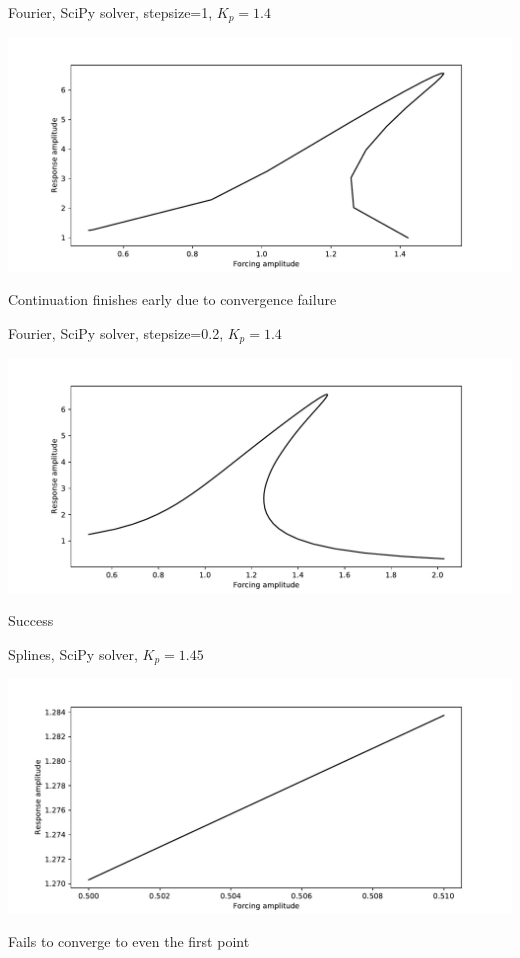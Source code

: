 \documentclass[presentation]{beamer}
\begin{document}
\begin{frame}[label={sec:org4d6362d}]{Fourier, SciPy solver, stepsize=1, \(K_p=1.4\)}
\begin{center}
\includegraphics[width=.9\linewidth]{./kp1d4_transtime100_scipy_fourier.pdf}
\end{center}

Continuation finishes early due to convergence failure
\end{frame}

\begin{frame}[label={sec:org28c3247}]{Fourier, SciPy solver, stepsize=0.2, \(K_p=1.4\)}
\begin{center}
\includegraphics[width=.9\linewidth]{./kp1d4_transtime100_scipy_fourier_ss0d2.pdf}
\end{center}

Success
\end{frame}

\begin{frame}[label={sec:org53061f6}]{Splines, SciPy solver, \(K_p=1.45\)}
\begin{center}
\includegraphics[width=.9\linewidth]{./kp1d45_transtime100_scipy.pdf}
\end{center}

Fails to converge to even the first point
\end{frame}
\end{document}
